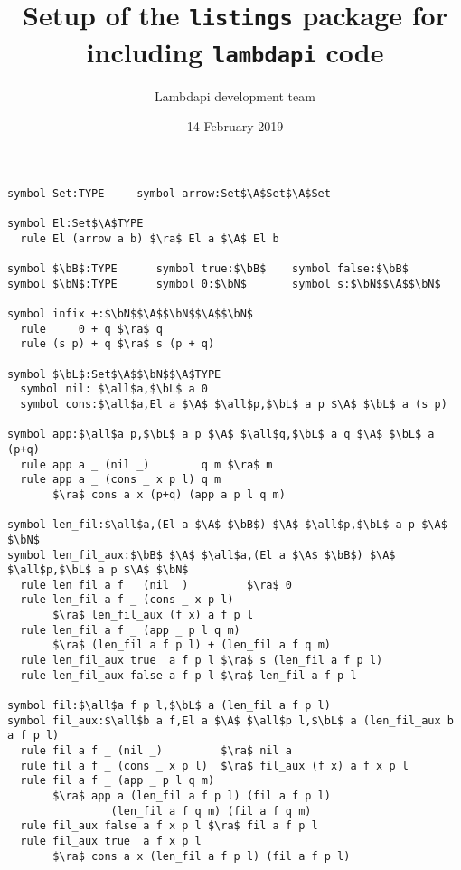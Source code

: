 \documentclass{article}
\title{Setup of the {\tt listings} package for including {\tt lambdapi} code}
\author{Lambdapi development team}
\date{14 February 2019}
\newcommand\bB{\mathbb{B}} %
\newcommand\bN{\mathbb{N}} %
\newcommand\bL{\mathbb{L}} %
\newcommand\A\Rightarrow %
\newcommand\ra\rightarrow %
\newcommand\all\forall %
\begin{document}
\maketitle

\small
\begin{lstlisting}[mathescape=true]
symbol Set:TYPE     symbol arrow:Set$\A$Set$\A$Set

symbol El:Set$\A$TYPE
  rule El (arrow a b) $\ra$ El a $\A$ El b

symbol $\bB$:TYPE      symbol true:$\bB$    symbol false:$\bB$
symbol $\bN$:TYPE      symbol 0:$\bN$       symbol s:$\bN$$\A$$\bN$

symbol infix +:$\bN$$\A$$\bN$$\A$$\bN$
  rule     0 + q $\ra$ q
  rule (s p) + q $\ra$ s (p + q)

symbol $\bL$:Set$\A$$\bN$$\A$TYPE
  symbol nil: $\all$a,$\bL$ a 0
  symbol cons:$\all$a,El a $\A$ $\all$p,$\bL$ a p $\A$ $\bL$ a (s p)

symbol app:$\all$a p,$\bL$ a p $\A$ $\all$q,$\bL$ a q $\A$ $\bL$ a (p+q)
  rule app a _ (nil _)        q m $\ra$ m
  rule app a _ (cons _ x p l) q m
       $\ra$ cons a x (p+q) (app a p l q m)

symbol len_fil:$\all$a,(El a $\A$ $\bB$) $\A$ $\all$p,$\bL$ a p $\A$ $\bN$
symbol len_fil_aux:$\bB$ $\A$ $\all$a,(El a $\A$ $\bB$) $\A$ $\all$p,$\bL$ a p $\A$ $\bN$
  rule len_fil a f _ (nil _)         $\ra$ 0
  rule len_fil a f _ (cons _ x p l)
       $\ra$ len_fil_aux (f x) a f p l
  rule len_fil a f _ (app _ p l q m)
       $\ra$ (len_fil a f p l) + (len_fil a f q m)
  rule len_fil_aux true  a f p l $\ra$ s (len_fil a f p l)
  rule len_fil_aux false a f p l $\ra$ len_fil a f p l

symbol fil:$\all$a f p l,$\bL$ a (len_fil a f p l)
symbol fil_aux:$\all$b a f,El a $\A$ $\all$p l,$\bL$ a (len_fil_aux b a f p l)
  rule fil a f _ (nil _)         $\ra$ nil a
  rule fil a f _ (cons _ x p l)  $\ra$ fil_aux (f x) a f x p l
  rule fil a f _ (app _ p l q m)
       $\ra$ app a (len_fil a f p l) (fil a f p l)
                (len_fil a f q m) (fil a f q m)
  rule fil_aux false a f x p l $\ra$ fil a f p l
  rule fil_aux true  a f x p l
       $\ra$ cons a x (len_fil a f p l) (fil a f p l)
\end{lstlisting}
\end{document}
